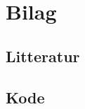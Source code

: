 \documentclass{article}
\begin{document}
\section{Bilag}
\subsection{Litteratur}
\subsection{Kode}
\end{document}
